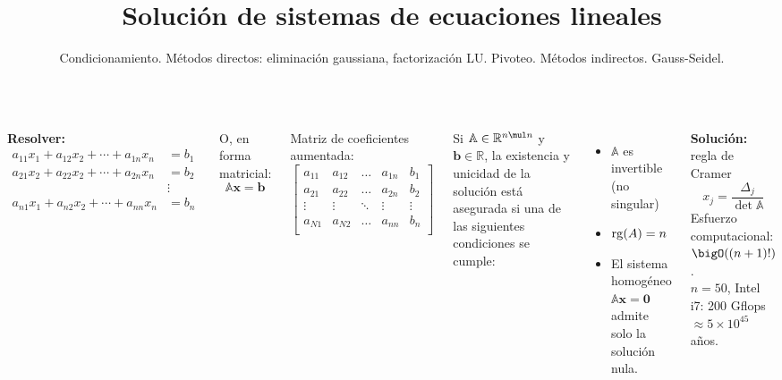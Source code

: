\documentclass[9pt, aspectratio=169]{beamer}
\title{Solución de sistemas de ecuaciones lineales}
\subtitle{Condicionamiento. Métodos directos: eliminación gaussiana, factorización LU. Pivoteo. Métodos indirectos. Gauss-Seidel.}
\begin{document}
\maketitle

\begin{frame}
\begin{columns}[t]
\textbf{Resolver:}
\begin{align*}
    a_{11}x_1+a_{12}x_2+\cdots +a_{1n}x_n &= b_1 \\
    a_{21}x_2+a_{22}x_2+\cdots +a_{2n}x_n &= b_2 \\
                                   & \vdots \\
    a_{n1}x_1+a_{n2}x_2+\cdots +a_{nn}x_n &= b_n \\
 \end{align*} \pause
\vspace{-2em}

 O, en forma matricial:
 \begin{equation*}
  \mathbb{A} \mathbf{x} = \mathbf{b}
 \end{equation*}  \pause
\vspace{-1em}

  Matriz de coeficientes aumentada:
\begin{equation*}
 \left[ 
 \begin{array}{cccc|c}
 a_{11} & a_{12} & \ldots & a_{1n} & b_1 \\
 a_{21} & a_{22} & \ldots & a_{2n} & b_2\\
 \vdots & \vdots & \ddots & \vdots & \vdots\\
 a_{N1} & a_{N2} & \ldots & a_{nn} & b_n \\
 \end{array} \right] 
\end{equation*} \pause


Si $\mathbb{A} \in \mathbb{R}^{n \mul n}$ y $\bm{b} \in \mathbb{R}$, la existencia y unicidad de la solución está asegurada si una de las siguientes condiciones se cumple:
\begin{itemize}
    \item $\mathbb{A}$ es invertible (no singular)
    \item $\operatorname{rg}(A) = n$
    \item El sistema homogéneo $\mathbb{A} \bm{x} = \bm{0}$ admite solo la solución nula.
\end{itemize}

\hrulefill \pause \vspace{1em}


\textbf{Solución:} regla de Cramer
\[ x_j = \frac{\Delta_j}{\det{\mathbb{A}}} \]
Esfuerzo computacional: $\bigO((n+ 1)!)$. \\
$n = 50$, Intel i7: 200 Gflops $\approx 5 \times 10^{45}$ años.

\end{columns}
\end{frame}
\end{document}
